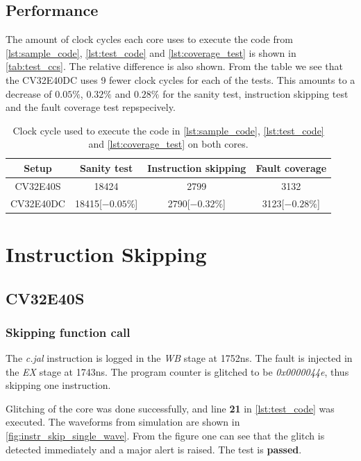 \subsection{Performance}

The amount of clock cycles each core uses to execute the code from \autoref{lst:sample_code}, \autoref{lst:test_code} and \autoref{lst:coverage_test} is shown in \autoref{tab:test_ccs}. The relative difference is also shown. From the table we see that the CV32E40DC uses 9 fewer clock cycles for each of the tests. This amounts to a decrease of $0.05\%$, $0.32\%$ and $0.28\%$ for the sanity test, instruction skipping test and the fault coverage test repspecively. 

\begin{table}[h!]
\centering
\caption{Clock cycle used to execute the code in \autoref{lst:sample_code}, \autoref{lst:test_code} and \autoref{lst:coverage_test} on both cores.}
\label{tab:test_ccs}
\begin{tabular}{c|ccc}
\toprule 
Setup & Sanity test & Instruction skipping & Fault coverage \\
\midrule
\rowcolor{black!20} CV32E40S & 18424 & 2799 & 3132\\
CV32E40DC & 18415[$-0.05\%$] & 2790[$-0.32\%$] & 3123[$-0.28\%$]\\
\bottomrule
\end{tabular}
\end{table}

\section{Instruction Skipping}
\label{sec:instr_skip_result}

\subsection{CV32E40S}
\label{subsec:single_instr_skip}

\subsubsection{Skipping function call}
\label{subsubsec:func_call}

The \textit{c.jal} instruction is logged in the \textit{WB} stage at 1752ns. The fault is injected in the \textit{EX} stage at 1743ns. The program counter is glitched to be \textit{0x0000044e}, thus skipping one instruction. 

Glitching of the core was done successfully, and line \textbf{21} in \autoref{lst:test_code} was executed. The waveforms from simulation are shown in \autoref{fig:instr_skip_single_wave}. From the figure one can see that the glitch is detected immediately and a major alert is raised. The test is \textbf{passed}.

